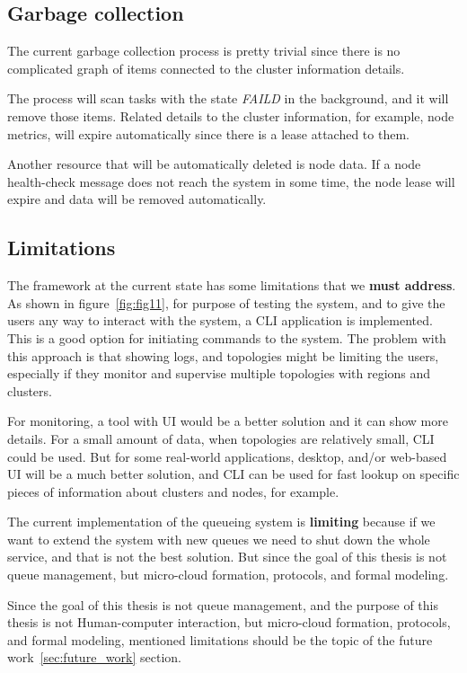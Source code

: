 \subsection{Garbage collection}\label{sec:gc}
%
The current garbage collection process is pretty trivial since there is no complicated graph of items connected to the cluster information details.

The process will scan tasks with the state \emph{FAILD} in the background, and it will remove those items. Related details to the cluster information, for example, node metrics, will expire automatically since there is a lease attached to them.

Another resource that will be automatically deleted is node data. If a node health-check message does not reach the system in some time, the node lease will expire and data will be removed automatically.
%
%
\subsection{Limitations}\label{sec:framework_limits}
% 
The framework at the current state has some limitations that we \textbf{must address}. As shown in figure~\ref{fig:fig11}, for purpose of testing the system, and to give the users any way to interact with the system, a CLI application is implemented. This is a good option for initiating commands to the system. The problem with this approach is that showing logs, and topologies might be limiting the users, especially if they monitor and supervise multiple topologies with regions and clusters.

For monitoring, a tool with UI would be a better solution and it can show more details. For a small amount of data, when topologies are relatively small, CLI could be used. But for some real-world applications, desktop, and/or web-based UI will be a much better solution, and CLI can be used for fast lookup on specific pieces of information about clusters and nodes, for example.

The current implementation of the queueing system is \textbf{limiting} because if we want to extend the system with new queues we need to shut down the whole service, and that is not the best solution. But since the goal of this thesis is not queue management, but micro-cloud formation, protocols, and formal modeling.

Since the goal of this thesis is not queue management, and the purpose of this thesis is not Human-computer interaction, but micro-cloud formation, protocols, and formal modeling, mentioned limitations should be the topic of the future work~\ref{sec:future_work} section.

